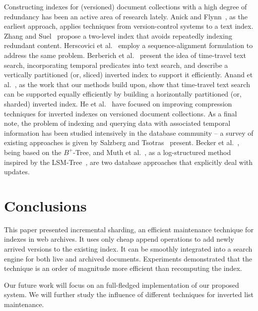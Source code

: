 Constructing indexes for (versioned) document collections with a high
degree of redundancy has been an active area of research lately. Anick
and Flynn~\cite{DBLP:conf/sigir/AnickF92}, as the earliest approach,
applies techniques from version-control systems to a text index. Zhang
and Suel~\cite{Zhang:2007fk} propose a two-level index that avoids
repeatedly indexing redundant content. Herscovici et
al.~\cite{DBLP:conf/ecir/HerscoviciLY07} employ a sequence-alignment
formulation to address the same problem. Berberich et
al.~\cite{kberberi:sigir2007} present the idea of time-travel text
search, incorporating temporal predicates into text search, and
describe a vertically partitioned (or, sliced) inverted index to
support it efficiently. Anand et al.~\cite{aanand:sigir2011}, as the
work that our methods build upon, show that time-travel text search
can be supported equally efficiently by building a horizontally
partitioned (or, sharded) inverted index. He et
al.~\cite{DBLP:conf/cikm/HeYS09,DBLP:conf/cikm/HeZS10} have focused on
improving compression techniques for inverted indexes on versioned
document collections. As a final note, the problem of indexing and
querying data with associated temporal information has been studied
intensively in the database community -- a survey of existing
approaches is given by Salzberg and Tsotras~\cite{salzberg:csur1999}
present. Becker et al.~\cite{Becker:1996aa}, being based on the
$B^{+}$-Tree, and Muth et al.~\cite{Muth2000}, as a log-structured
method inspired by the LSM-Tree~\cite{ONeil:1996fk}, are two database
approaches that explicitly deal with updates.


\section{Conclusions}
\label{sec:conclusions}

This paper presented incremental sharding, an efficient maintenance
technique for indexes in web archives. It uses only cheap append
operations to add newly arrived versions to the existing index. It can
be smoothly integrated into a search engine for both live and archived
documents. Experiments demonstrated that the technique is an order of
magnitude more efficient than recomputing the index.

Our future work will focus on an full-fledged implementation of our
proposed system. We will further study the influence of different
techniques for inverted list maintenance.

